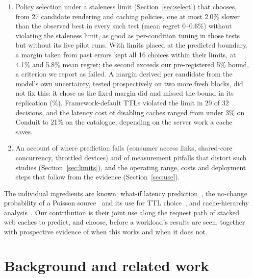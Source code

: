 \documentclass[acmsmall,review,nonacm]{acmart}
\begin{document}
\begin{enumerate}
\item Policy selection under a staleness limit (Section~\ref{sec:select}) that chooses, from 27 candidate rendering and caching policies, one at most 2.0\% slower than the observed best in every such test (mean regret 0--0.6\%) without violating the staleness limit, as good as per-condition tuning in those tests but without its live pilot runs. With limits placed at the predicted boundary, a margin taken from past errors kept all 16 choices within their limits, at 4.1\% and 5.8\% mean regret; the second exceeds our pre-registered 5\% bound, a criterion we report as failed. A margin derived per candidate from the model's own uncertainty, tested prospectively on two more fresh blocks, did not fix this: it chose as the fixed margin did and missed the bound in its replication (\ccRCcRegret\%). Framework-default TTLs violated the limit in 29 of 32 decisions, and the latency cost of disabling caches ranged from under 3\% on Conduit to 21\% on the catalogue, depending on the server work a cache saves.
\item An account of where prediction fails (consumer access links, shared-core concurrency, throttled devices) and of measurement pitfalls that distort such studies (Section~\ref{sec:limits}), and the operating range, costs and deployment steps that follow from the evidence (Section~\ref{sec:use}).
\end{enumerate}
The individual ingredients are known: what-if latency prediction~\cite{li2010webprophet,jiang2016webperf}, the no-change probability of a Poisson source~\cite{cho2000freshness} and its use for TTL choice~\cite{gessert2017quaestor}, and cache-hierarchy analysis~\cite{che2002hierarchical,fofack2014ttl}. Our contribution is their joint use along the request path of stacked web caches to predict, and choose, before a workload's results are seen, together with prospective evidence of when this works and when it does not.

\section{Background and related work}
\label{sec:related}
\end{document}

